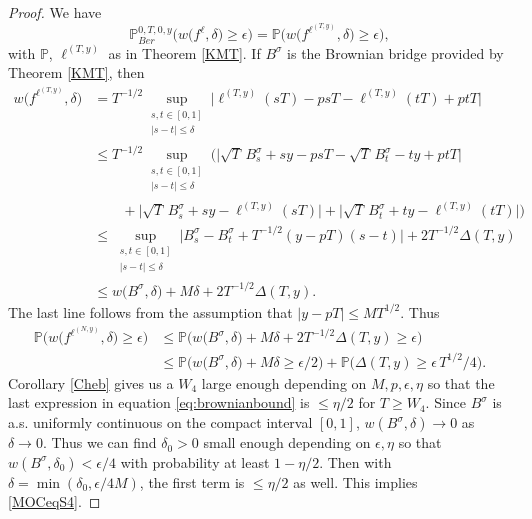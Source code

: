 \begin{proof}
	We have
	\[
	\mathbb{P}^{0,T,0,y}_{Ber}\Big( w\big({f^\ell},\delta\big) \geq \epsilon \Big) = \mathbb{P}\Big( w\big(f^{\ell^{(T,y)}},\delta\big) \geq \epsilon \Big),
	\]
	with $\mathbb{P}$, $\ell^{(T,y)}$ as in Theorem \ref{KMT}. If $B^\sigma$ is the Brownian bridge provided by Theorem \ref{KMT}, then
	\begin{align*}
	w\big(f^{\ell^{(T,y)}},\delta\big) &= T^{-1/2} \sup_{\substack{s,t \in [0,1]\\ |s-t| \leq \delta}} \Big| \ell^{(T,y)}(sT) - psT - \ell^{(T,y)}(tT) + ptT \Big|\\
	&\leq T^{-1/2} \sup_{\substack{s,t \in [0,1]\\ |s-t| \leq \delta}} \Big(\big| \sqrt{T}\,B^\sigma_s + sy - psT - \sqrt{T}\,B^\sigma_t - ty + ptT \big|\\
	&\qquad + \big|\sqrt{T}\,B^\sigma_s + sy - \ell^{(T,y)}(sT)\big| + \big|\sqrt{T}\,B^\sigma_t + ty - \ell^{(T,y)}(tT)\big|\Big)\\
	&\leq \sup_{\substack{s,t \in [0,1]\\ |s-t| \leq \delta}} \Big| B^\sigma_s - B^\sigma_t + T^{-1/2} (y-pT)(s-t)\Big| + 2T^{-1/2}\Delta(T,y)\\
	&\leq w\big(B^\sigma,\delta\big) + M\delta + 2T^{-1/2}\Delta(T,y).
	\end{align*}
	The last line follows from the assumption that $|y-pT|\leq MT^{1/2}$. Thus
	\begin{equation}\label{eq:brownianbound}
	\begin{split}
	\mathbb{P}\Big( w\big(f^{\ell^{(N,y)}},\delta\big) \geq \epsilon \Big) &\leq \mathbb{P}\Big( w\big(B^\sigma,\delta\big) + M\delta + 2T^{-1/2}\Delta(T,y) \geq \epsilon \Big)\\
	&\leq \mathbb{P}\Big( w\big(B^\sigma,\delta\big) + M\delta \geq \epsilon/2 \Big) + \mathbb{P}\Big( \Delta(T,y) \geq \epsilon\, T^{1/2}/4 \Big).
	\end{split}
	\end{equation}
	Corollary \ref{Cheb} gives us a $W_4$ large enough depending on $M,p,\epsilon,\eta$ so that the last expression in equation \ref{eq:brownianbound} is $\leq\eta/2$ for $T\geq W_4$. Since $B^\sigma$ is a.s. uniformly continuous on the compact interval $[0,1]$, $w(B^\sigma,\delta) \to 0$ as $\delta\to 0$. Thus we can find $\delta_0>0$ small enough depending on $\epsilon,\eta$ so that $w(B^\sigma,\delta_0) < \epsilon/4$ with probability at least $1-\eta/2$. Then with $\delta = \min(\delta_0, \epsilon/4M)$, the first term is $\leq\eta/2$ as well. This implies \eqref{MOCeqS4}.
\end{proof}

